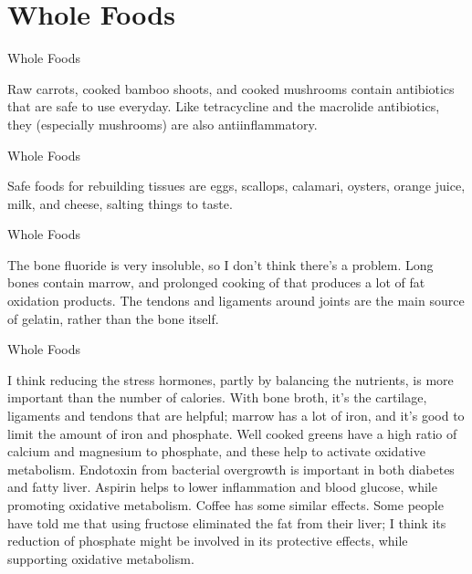 \documentclass[11pt,oneside,openany,extrafontsizes]{memoir}
\begin{document}
\section{Whole Foods}

\begin{standalonequote}{Whole Foods}

    \begin{answer}
       Raw carrots, cooked bamboo shoots, and cooked mushrooms contain antibiotics that are safe to use everyday. Like tetracycline and the macrolide antibiotics, they (especially mushrooms) are also antiinflammatory. 
    \end{answer}
\end{standalonequote}

\begin{standalonequote}{Whole Foods}

    \begin{answer}
       Safe foods for rebuilding tissues are eggs, scallops, calamari, oysters, orange juice, milk, and cheese, salting things to taste. 
    \end{answer}
\end{standalonequote}

\begin{standalonequote}{Whole Foods}

    \begin{answer}
      The bone fluoride is very insoluble, so I don't think there's a problem. Long bones contain marrow, and prolonged cooking of that produces a lot of fat oxidation products. The tendons and ligaments around joints are the main source of gelatin, rather than the bone itself.
    \end{answer}
\end{standalonequote}

\begin{standalonequote}{Whole Foods}

    \begin{answer}
      I think reducing the stress hormones, partly by balancing the nutrients, is more important than the number of calories. With bone broth, it's the cartilage, ligaments and tendons that are helpful; marrow has a lot of iron, and it's good to limit the amount of iron and phosphate. Well cooked greens have a high ratio of calcium and magnesium to phosphate, and these help to activate oxidative metabolism. Endotoxin from bacterial overgrowth is important in both diabetes and fatty liver. Aspirin helps to lower inflammation and blood glucose, while promoting oxidative metabolism. Coffee has some similar effects. Some people have told me that using fructose eliminated the fat from their liver; I think its reduction of phosphate might be involved in its protective effects, while supporting oxidative metabolism.
    \end{answer}
\end{standalonequote}
\end{document}
